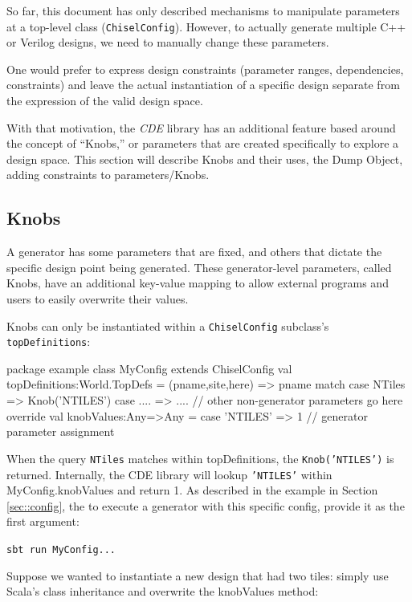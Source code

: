 \documentclass[10pt,twocolumn]{article}
\def\code#1{{\small\tt #1}}
\begin{document}
So far, this document has only described mechanisms to manipulate parameters at a top-level class (\code{ChiselConfig}). However, to actually generate multiple C++ or Verilog designs, we need to manually change these parameters.

One would prefer to express design constraints (parameter ranges, dependencies, constraints) and leave the actual instantiation of a specific design separate from the expression of the valid design space.

With that motivation, the {\em CDE} library has an additional feature
based around the concept of ``Knobs,'' or parameters that are created
specifically to explore a design space. This section will describe
Knobs and their uses, the Dump Object, adding constraints to
parameters/Knobs.

\subsection{Knobs}
A generator has some parameters that are fixed, and others that dictate the specific design point being generated. These generator-level parameters, called Knobs, have an additional key-value mapping to allow external programs and users to easily overwrite their values.

Knobs can only be instantiated within a \code{ChiselConfig} subclass's \code{topDefinitions}:

\begin{scala}
package example
class MyConfig extends ChiselConfig {
  val topDefinitions:World.TopDefs = {
    (pname,site,here) => pname match {
      case NTiles => Knob('NTILES')
      case .... => .... // other non-generator parameters go here
    }
  }
  override val knobValues:Any=>Any = {
    case 'NTILES' => 1 // generator parameter assignment
  }
}
\end{scala}

When the query \code{NTiles} matches within topDefinitions, the
\code{Knob('NTILES')} is returned. Internally,
the CDE library will lookup \code{'NTILES'} within MyConfig.knobValues
and return 1.
As described in the example in Section \ref{sec::config}, the
to execute a generator with this specific config, provide it as the
first argument:

\code{sbt run MyConfig...}

Suppose we wanted to instantiate a new design that had two tiles: simply use Scala's class inheritance and overwrite the knobValues method:
\end{document}
